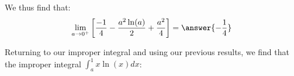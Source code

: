 \documentclass{ximera}
\begin{document}
\begin{exercise}
\begin{exercise}
\begin{exercise}
\begin{exercise}
\begin{exercise}

We thus find that:
\[
\lim_{a \to 0^+} \left[ \frac{-1}{4} -\frac{a^2\ln(a)}{2}+\frac{a^2}{4}  \right] = \answer{-\frac{1}{4}}
\]

Returning to our improper integral and using our previous results, we find that the improper integral $\int_{a}^{1} x\ln(x) dx$: 

\begin{multipleChoice}
\end{multipleChoice}

\end{exercise}
\end{exercise}
\end{exercise}
\end{exercise}
\end{exercise}
\end{document}
